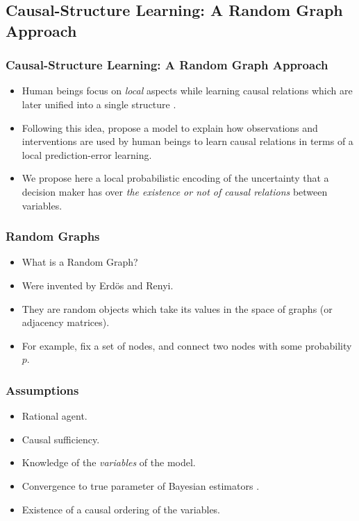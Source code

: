 \documentclass{beamer}
\theoremstyle{plain}
\begin{document}
\subsection{Causal-Structure Learning: A Random Graph Approach}{\label{random_graph}}
\begin{frame}
\frametitle{Causal-Structure Learning: A Random Graph Approach}
\begin{itemize}
\item Human beings focus on \textit{local} aspects while learning causal relations which are later unified into a single structure \citep{fernbach2009causal,waldmann2008causal, danks2014unifying}.
\item Following this idea, \cite{wellen2012learning} propose a model to explain how observations  and interventions are used by human beings to learn causal relations in terms of a local prediction-error learning.
\item We propose here a local probabilistic encoding of the uncertainty that a decision maker has over \textit{the existence or not of causal relations} between variables.
\end{itemize}
\end{frame}

\begin{frame}
\frametitle{Random Graphs}
\begin{itemize}
\item What is a Random Graph? 
\item Were invented by Erdös and Renyi. 
\item They are random objects which take its values in the space of graphs (or adjacency matrices).
\item For example, fix a set of nodes, and connect two nodes with some probability $p$.
\end{itemize}
\end{frame}

\begin{frame}
\frametitle{Assumptions}
\begin{itemize}
\item Rational agent.
\item Causal sufficiency.
\item Knowledge of the \textit{variables} of the model.
\item Convergence to true parameter of Bayesian estimators \cite{autzen2018bayesian}.
\item Existence of a causal ordering of the variables.
\end{itemize}
\end{frame}
\end{document}
